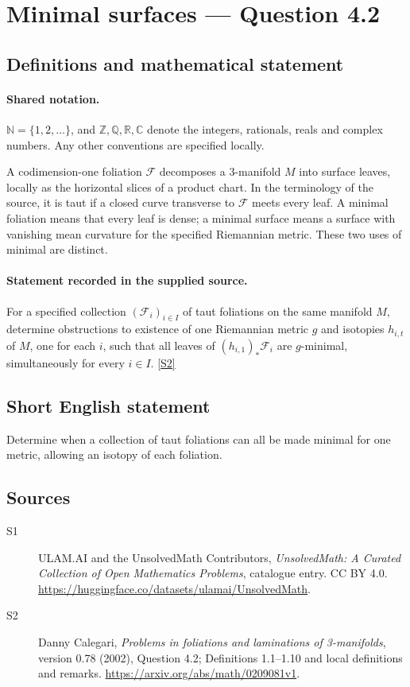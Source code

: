 \documentclass[11pt]{article}
\newcommand{\sref}[2]{\hyperlink{source:#1:#2}{[S#2]}}
\begin{document}
\section{Minimal surfaces — Question 4.2}\label{statement}

\subsection{Definitions and mathematical statement}

\paragraph{Shared notation.}$\mathbb N=\{1,2,\ldots\}$, and $\mathbb Z,\mathbb Q,\mathbb R,\mathbb C$ denote the integers, rationals, reals and complex numbers. Any other conventions are specified locally.


A codimension-one foliation $\mathcal F$ decomposes a $3$-manifold $M$ into surface leaves, locally as the horizontal slices of a product chart. In the terminology of the source, it is taut if a closed curve transverse to $\mathcal F$ meets every leaf. A minimal foliation means that every leaf is dense; a minimal surface means a surface with vanishing mean curvature for the specified Riemannian metric. These two uses of minimal are distinct.
\paragraph{Statement recorded in the supplied source.}
For a specified collection $(\mathcal F_i)_{i\in I}$ of taut foliations on the same manifold $M$, determine obstructions to existence of one Riemannian metric $g$ and isotopies $h_{i,t}$ of $M$, one for each $i$, such that all leaves of $(h_{i,1})_*\mathcal F_i$ are $g$-minimal, simultaneously for every $i\in I$. \sref{statement}{2}
\subsection{Short English statement}
Determine when a collection of taut foliations can all be made minimal for one metric, allowing an isotopy of each foliation.
\subsection{Sources}
\begin{description}
\item[\hypertarget{source:statement:1}{S1}] ULAM.AI and the UnsolvedMath Contributors, \emph{UnsolvedMath: A Curated Collection of Open Mathematics Problems}, catalogue entry. CC BY 4.0. \url{https://huggingface.co/datasets/ulamai/UnsolvedMath}.
\item[\hypertarget{source:statement:2}{S2}] Danny Calegari, \emph{Problems in foliations and laminations of 3-manifolds}, version 0.78 (2002), Question 4.2; Definitions 1.1--1.10 and local definitions and remarks. \url{https://arxiv.org/abs/math/0209081v1}.
\end{description}
\label{end:statement}
\end{document}
